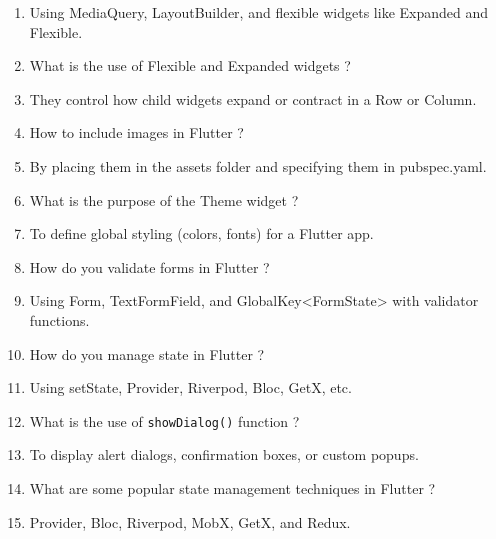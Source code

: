 \documentclass{article}
\def \answer{\item[$\rightarrow$]}
\begin{document}
\begin{enumerate}
		\answer Using MediaQuery, LayoutBuilder, and flexible widgets like Expanded and Flexible.
		\\
		\item  What is the use of Flexible and Expanded widgets ?
		\answer They control how child widgets expand or contract in a Row or Column.
		\\
		\item  How to include images in Flutter ?
		\answer By placing them in the assets folder and specifying them in pubspec.yaml.
		\\
		\item  What is the purpose of the Theme widget ?
		\answer To define global styling (colors, fonts) for a Flutter app.
		\\
		\item  How do you validate forms in Flutter ?
		\answer Using Form, TextFormField, and GlobalKey<FormState> with validator functions.
		\\
		\item  How do you manage state in Flutter ?
		\answer Using setState, Provider, Riverpod, Bloc, GetX, etc.
		\\
		\item  What is the use of \texttt{showDialog()} function ?
		\answer To display alert dialogs, confirmation boxes, or custom popups.
		\\
		\item  What are some popular state management techniques in Flutter ?
		\answer Provider, Bloc, Riverpod, MobX, GetX, and Redux.
	\end{enumerate}
\end{document}
